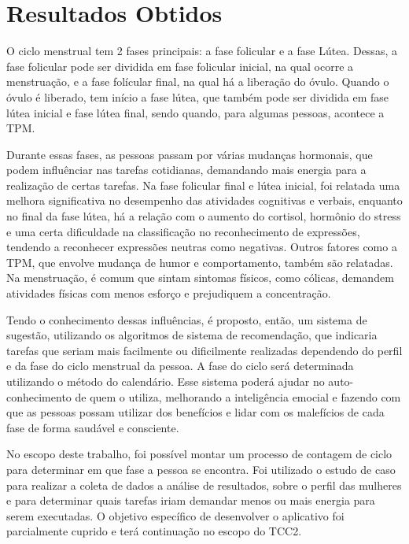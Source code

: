 \chapter[Resultados Obtidos]{Resultados Obtidos}

O ciclo menstrual tem 2 fases principais: a fase folicular e a fase Lútea. Dessas, a fase folicular 
pode 
ser dividida em fase folicular inicial, na qual ocorre a menstruação, e a fase folícular final, na qual 
há a liberação do óvulo.
Quando o óvulo é liberado, tem início a fase lútea, que também pode ser dividida em fase lútea inicial e 
fase lútea final, sendo quando, para algumas pessoas, acontece a TPM.

Durante essas fases, as pessoas passam por várias mudanças hormonais, que podem influênciar nas tarefas 
cotidianas, demandando mais energia para a realização de certas tarefas. Na fase folicular final e lútea inicial,
foi relatada uma melhora significativa no desempenho das atividades cognitivas e verbais, enquanto no final da fase 
lútea, há a relação com o aumento do cortisol, hormônio do stress e uma certa dificuldade na classificação 
no reconhecimento de expressões, tendendo a reconhecer expressões neutras como negativas. Outros fatores como a TPM, que envolve
mudança de humor e comportamento, também são relatadas. Na menstruação, é comum que sintam sintomas físicos, como cólicas, demandem 
atividades físicas com menos esforço e prejudiquem a concentração. 

Tendo o conhecimento dessas influências, é proposto, então, um sistema de sugestão, utilizando os algoritmos de sistema de recomendação, 
que indicaria tarefas que seriam mais facilmente ou dificilmente realizadas dependendo do perfil e da fase do ciclo menstrual da pessoa. A fase 
do ciclo será determinada utilizando o método do calendário. Esse sistema poderá ajudar no auto-conhecimento de quem o utiliza, melhorando a inteligência emocial e fazendo com que 
as pessoas possam utilizar dos benefícios e lidar com os malefícios de cada fase de forma saudável e consciente.

No escopo deste trabalho, foi possível montar um processo de contagem de ciclo para determinar em que fase a pessoa se encontra. Foi utilizado 
o estudo de caso para realizar a coleta de dados a análise de resultados, sobre o perfil das mulheres e para determinar quais tarefas iriam demandar 
menos ou mais energia para serem executadas. O objetivo específico de desenvolver o aplicativo foi parcialmente cuprido e terá continuação no escopo do TCC2.

